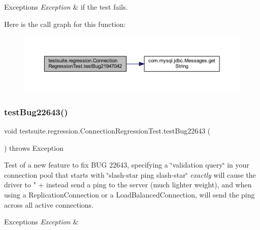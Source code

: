 \begin{DoxyExceptions}{Exceptions}
{\em Exception} & if the test fails. \\
\hline
\end{DoxyExceptions}
Here is the call graph for this function\+:
\nopagebreak
\begin{figure}[H]
\begin{center}
\leavevmode
\includegraphics[width=350pt]{classtestsuite_1_1regression_1_1_connection_regression_test_a071fe5a492bac37a1a3f0c9326d44ed8_cgraph}
\end{center}
\end{figure}
\mbox{\label{classtestsuite_1_1regression_1_1_connection_regression_test_aa286edfd17b719033e82cd5b359f2e4f}} 
\subsubsection{\texorpdfstring{test\+Bug22643()}{testBug22643()}}
{\footnotesize\ttfamily void testsuite.\+regression.\+Connection\+Regression\+Test.\+test\+Bug22643 (\begin{DoxyParamCaption}{ }\end{DoxyParamCaption}) throws Exception}

Test of a new feature to fix B\+UG 22643, specifying a \char`\"{}validation query\char`\"{} in your connection pool that starts with \char`\"{}slash-\/star ping slash-\/star\char`\"{} {\itshape exactly} will cause the driver to " + instead send a ping to the server (much lighter weight), and when using a Replication\+Connection or a Load\+Balanced\+Connection, will send the ping across all active connections.


\begin{DoxyExceptions}{Exceptions}
{\em Exception} & \\
\hline
\end{DoxyExceptions}
\mbox{\label{classtestsuite_1_1regression_1_1_connection_regression_test_a36543b7a9aa8ea81c2e039db4955494c}} 
